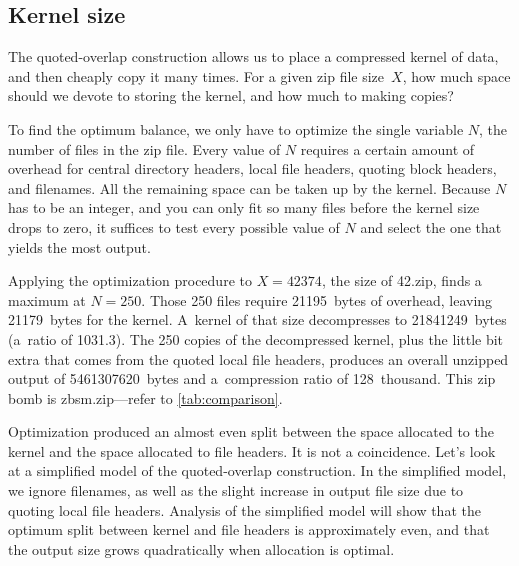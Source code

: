 \documentclass[letterpaper,twocolumn,10pt]{article}
\begin{document}

\subsection{Kernel size}
\label{sec:allocation}

The quoted-overlap construction
allows us to place a compressed kernel of data,
and then cheaply copy it many times.
For a given zip file size~$X$,
how much space should we devote to storing the kernel,
and how much to making copies?

To find the optimum balance,
we only have to optimize the single variable $N$,
the number of files in the zip file.
Every value of $N$ requires
a certain amount of overhead for
central directory headers,
local file headers,
quoting block headers, and filenames.
All the remaining space can be taken up by the kernel.
Because $N$ has to be an integer,
and you can only fit so many files
before the kernel size drops to zero,
it suffices to test every possible value of $N$
and select the one that yields the most output.

Applying the optimization procedure to $X = \num{42374}$,
the size of 42.zip,
finds a maximum at $N = 250$.
Those \num{250} files require \SI{21195}{bytes} of overhead,
leaving \SI{21179}{bytes} for the kernel.
A~kernel of that size decompresses to \SI{21841249}{bytes}
(a~ratio of \num{1031.3}).
The \num{250} copies of the decompressed kernel,
plus the little bit extra that comes from the quoted local file headers,
produces an overall unzipped output of
\SI{5461307620}{bytes}
and a~compression ratio of 128~thousand.
This zip bomb is \mbox{zbsm.zip}---refer to \autoref{tab:comparison}.

Optimization produced an almost even split
between the space allocated to the kernel
and the space allocated to file headers.
It is not a coincidence.
Let's look at a simplified model of the quoted-overlap construction.
In the simplified model,
we ignore filenames,
as well as the slight increase in output file size
due to quoting local file headers.
Analysis of the simplified model will show that the optimum
split between kernel and file headers is approximately even,
and that the output size grows quadratically
when allocation is optimal.
\end{document}
